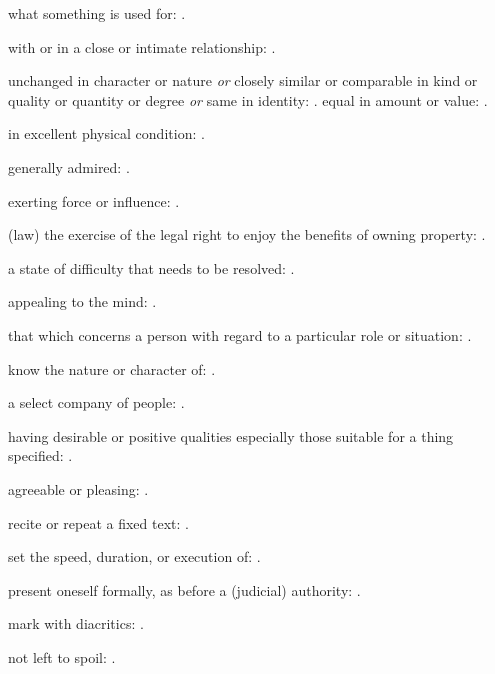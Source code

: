   what something is used for:   .

  with or in a close or intimate relationship:   .

  unchanged in character or nature \textit{or} closely similar or comparable in kind or quality or quantity or degree \textit{or} same in identity: . equal in amount or value:   .

  in excellent physical condition:   .

  generally admired: .

  exerting force or influence:   .

  (law) the exercise of the legal right to enjoy the benefits of owning property:   .

  a state of difficulty that needs to be resolved:   .

  appealing to the mind:   .

  that which concerns a person with regard to a particular role or situation: .

  know the nature or character of: .

  a select company of people: .

  having desirable or positive qualities especially those suitable for a thing specified: .

  agreeable or pleasing: .

  recite or repeat a fixed text: .

  set the speed, duration, or execution of: .

  present oneself formally, as before a (judicial) authority: .

  mark with diacritics: .

  not left to spoil:   .

